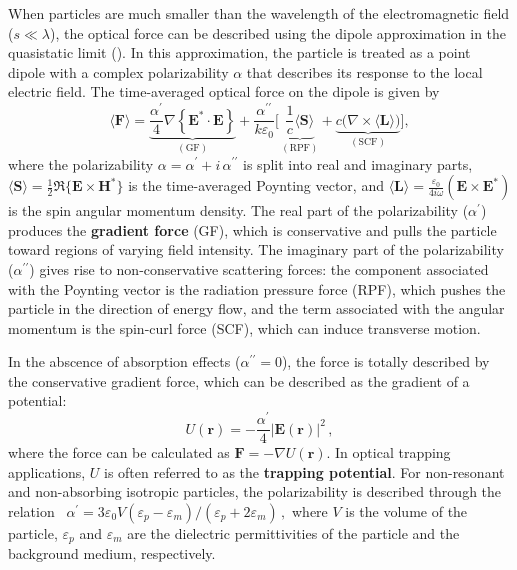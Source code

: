 When particles are much smaller than the wavelength of the electromagnetic field 
($s \ll \lambda$), the optical force can be described using the dipole approximation 
in the quasistatic limit (). In this approximation, the 
particle is treated as a point dipole with a complex polarizability $\alpha$ that 
describes its response to the local electric field. 
The time-averaged optical force on the dipole is given by~\cite{novotny}
\begin{equation}\label{eq:dip_force}
    \langle \mathbf{F} \rangle = 
    \underbrace{\frac{\alpha^{\prime}}{4} \nabla\left\{ \mathbf{E}^* \cdot \mathbf{E} \right\}}_{(\text{GF})}
    + \frac{\alpha^{\prime\prime}}{k \varepsilon_0}
    \Big[\, \underbrace{\frac{1}{c} \langle \mathbf{S} \rangle}_{(\text{RPF})}
    + \underbrace{c \big( \nabla \times \langle \mathbf{L} \rangle \big)}_{(\text{SCF})} \Big],
\end{equation}
where the polarizability $\alpha = \alpha^\prime + i\,\alpha^{\prime\prime}$ is split into 
real and imaginary parts, $\langle \mathbf{S} \rangle = \frac{1}{2} \Re\{\mathbf{E} \times 
\mathbf{H}^*\}$ is the time-averaged Poynting vector, and 
$\langle \mathbf{L} \rangle = \frac{\varepsilon_0}{4 i \omega} (\mathbf{E} \times \mathbf{E}^*)$ 
is the spin angular momentum density. The real part of the polarizability ($\alpha^\prime$) produces the 
\textbf{gradient force} (GF), which is conservative and pulls the particle toward regions 
of varying field intensity. The imaginary part of the polarizability ($\alpha^{\prime\prime}$) 
gives rise to non-conservative scattering forces: the component associated with the Poynting vector is 
the radiation pressure force (RPF), which pushes the particle in the direction of energy 
flow, and the term associated with the angular momentum is the spin-curl force (SCF), 
which can induce transverse motion. 

In the abscence of absorption effects ($\alpha^{\prime \prime}=0$), the force is totally described 
by the conservative gradient force, which can be described as the gradient 
of a potential:
\begin{equation*}
    U (\mathbf{r}) = -\frac{\alpha^{\prime}}{4} \left|\mathbf{E}(\mathbf{r})\right|^2\,,
\end{equation*}
where the force can be calculated as $\mathbf{F} = -\nabla U(\mathbf{r})$. In optical trapping applications, $U$ is often referred to as the \textbf{trapping potential}.
For non-resonant and non-absorbing isotropic particles, the polarizability is 
described through the relation~\cite{BornWolf:1999:Book} 
    $\alpha^{\prime}= 3 \varepsilon_0 V (\varepsilon_p-\varepsilon_m)/(\varepsilon_p+2 \varepsilon_m)\,,$
where $V$ is the volume of the particle, $\varepsilon_p$ and $\varepsilon_m$ are the
dielectric permittivities of the particle and the background medium, respectively. 

